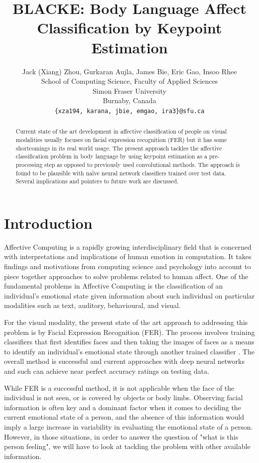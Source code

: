 \documentclass{article}
\title{BLACKE: Body Language Affect Classification by Keypoint Estimation}
\author{Jack (Xiang) Zhou, Gurkaran Aujla, James Bie, Eric Gao, Insoo Rhee\\
	School of Computing Science, 	
	Faculty of Applied Sciences\\
	Simon Fraser University\\
	Burnaby, Canada\\
	\texttt{\{xza194, karana, jbie, emgao, ira3\}@sfu.ca} \\
}
\begin{document}
\maketitle

\begin{abstract}
Current state of the art development in affective classification of people on visual modalities usually focuses on facial expression recognition (FER) but it has some shortcomings in its real world usage. The present approach tackles the affective classification problem in body language by using keypoint estimation as a pre-processing step as opposed to previously used convolutional methods. The approach is found to be plausible with na\"ive neural network classifiers trained over test data. Several implications and pointers to future work are discussed.
\end{abstract}

\section{Introduction}

Affective Computing is a rapidly growing interdisciplinary field that is concerned with interpretations and implications of human emotion in computation. It takes findings and motivations from computing science and psychology into account to piece together approaches to solve problems related to human affect. One of the fundamental problems in Affective Computing is the classification of an individual's emotional state given information about such individual on particular modalities such as text, auditory, behavioural, and visual.

For the visual modality, the present state of the art approach to addressing this problem is by Facial Expression Recognition (FER). The process involves training classifiers that first identifies faces and then taking the images of faces as a means to identify an individual's emotional state through another trained classifier \citep{li2018deep}. The overall method is successful and current approaches with deep neural networks and such can achieve near perfect accuracy ratings on testing data. 

While FER is a successful method, it is not applicable when the face of the individual is not seen, or is covered by objects or body limbs. Observing facial information is often key and a dominant factor when it comes to deciding the current emotional state of a person, and the absence of this information would imply a large increase in variability in evaluating the emotional state of a person. However, in those situations, in order to answer the question of "what is this person feeling", we will have to look at tackling the problem with other available information.
\end{document}
